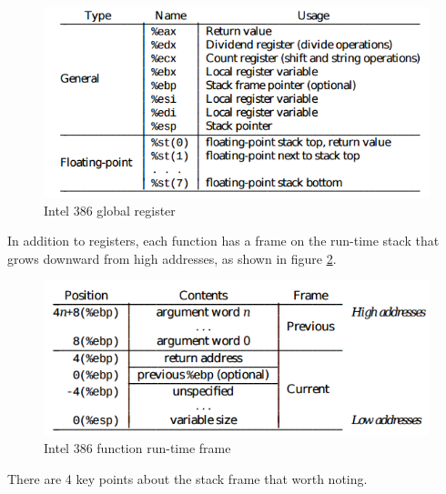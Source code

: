             \begin{figure}[H]
                \centering
                \includegraphics[scale = 0.4]
                {Images/concepts/Register.png}
                \caption[Intel 386 global register]%
                {Intel 386 global register\cite{SCO-386}}   
                \label{fig:Register}
            \end{figure}
            
            
        In addition to registers, each function has a frame on the run-time stack that grows downward from high addresses\cite{SCO-386}, as shown in figure \ref{fig:FunctionStack}.
        
        
            \begin{figure}
                \centering
                \includegraphics[scale = 0.4]
                {Images/concepts/FunctionStack.png}
                \caption[Intel 386 function run-time frame]%
                {Intel 386  function run-time frame\cite{SCO-386}}   
                \label{fig:FunctionStack}
            \end{figure}
            
        There are 4 key points about the stack frame that worth noting.
        
